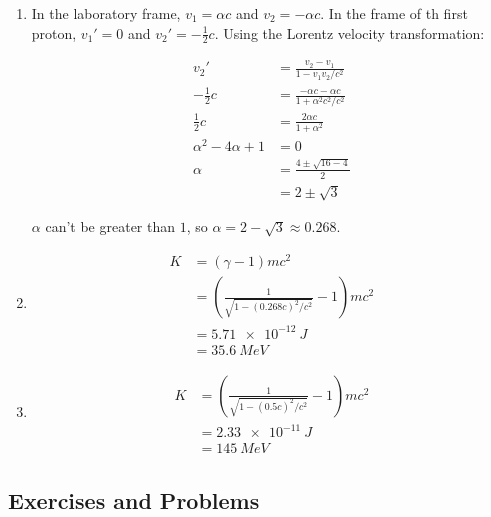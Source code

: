 \documentclass{article}
\begin{document}
\begin{enumerate}
  \item In the laboratory frame, $v_1 = \alpha c$ and $v_2 = -\alpha c$. In the frame of th first proton, $v_1' = 0$ and $v_2' = -\frac{1}{2} c$. Using the Lorentz velocity transformation:

        \begin{align*}
          v_2'                    & = \frac{v_2 - v_1}{1 - v_1 v_2 / c^2}                 \\
          -\frac{1}{2} c          & = \frac{-\alpha c - \alpha c}{1 + \alpha^2 c^2 / c^2} \\
          \frac{1}{2} c           & = \frac{2 \alpha c}{1 + \alpha^2}                     \\
          \alpha^2 - 4 \alpha + 1 & = 0                                                   \\
          \alpha                  & = \frac{4 \pm \sqrt{16 - 4}}{2}                       \\
                                  & = 2 \pm \sqrt{3}
        \end{align*}

        $\alpha$ can't be greater than $1$, so $\alpha = 2 - \sqrt{3} \approx 0.268$.

  \item

        \begin{align*}
          K & = (\gamma - 1) m c^2                                              \\
            & = \left( \frac{1}{\sqrt{1 - (0.268 c)^2 / c^2}} - 1 \right) m c^2 \\
            & = \qty{5.71e-12}{J}                                               \\
            & = \qty{35.6}{MeV}
        \end{align*}

  \item

        \begin{align*}
          K & = \left( \frac{1}{\sqrt{1 - (0.5 c)^2 / c^2}} - 1 \right) m c^2 \\
            & = \qty{2.33e-11}{J}                                             \\
            & = \qty{145}{MeV}
        \end{align*}
\end{enumerate}

\subsection{Exercises and Problems}
\end{document}
